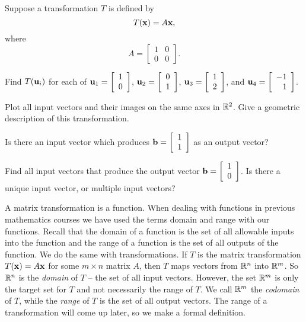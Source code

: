 \begin{pa}
	
\item Suppose a transformation $T$ is defined by 
\[T(\mathbf{x}) = A\mathbf{x},\]
where 
\[A = \left[ \begin{array}{cc} 1&0 \\ 0&0 \end{array} \right].\]
	\ba
	\item Find $T(\mathbf{u}_i)$ for each of $\mathbf{u}_1 = \left[ \begin{array}{c}  1 \\ 0 \end{array} \right]$, $\mathbf{u}_2 = \left[ \begin{array}{c}  0\\1 \end{array} \right]$, $\mathbf{u}_3 = \left[ \begin{array}{c} 1  \\ 2 \end{array} \right]$, and  $\mathbf{u}_4 = \left[ \begin{array}{r} -1  \\ 1 \end{array} \right]$. 


	\item Plot all input vectors and their images on the same axes in $\mathbb{R}^2$. Give a geometric description of this transformation.

	\item Is there an input vector which produces $\mathbf{b} = \left[ \begin{array}{c}  1 \\ 1 \end{array} \right]$ as an output vector?


	\item Find all input vectors that produce the output vector $\mathbf{b} = \left[ \begin{array}{c}  1 \\ 0 \end{array} \right]$. Is there a unique input vector, or multiple input vectors? 

	\ea
	

\ee
\end{pa}


\label{sec:mtx_trans_prop}

A matrix transformation is a function. When dealing with functions in previous mathematics courses we have used the terms domain and range with our functions. Recall that the domain of a function is the set of all allowable inputs into the function and the range of a function is the set of all outputs of the function. We do the same with transformations. If $T$ is the matrix transformation $T(\mathbf{x}) = A \mathbf{x}$ for some $m \times n$ matrix $A$, then $T$ maps vectors from $\mathbb{R}^n$ into $\mathbb{R}^m$. So $\mathbb{R}^n$ is the \emph{domain} of $T$ -- the set of all input vectors. However, the set $\mathbb{R}^m$ is only the target set for $T$ and not necessarily the range of $T$.  We call $\mathbb{R}^m$ the \emph{codomain}  of $T$, while the \emph{range} of $T$ is the set of all output vectors. The range of a transformation will come up later, so we make a formal definition.

